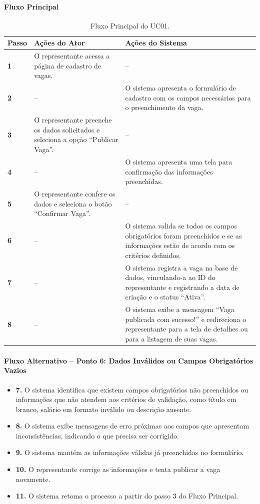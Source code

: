\documentclass[
    12pt,
    oneside,
    a4paper,
    brazil
]{abntex2}
\begin{document}
\paragraph{Fluxo Principal}
\begin{table}[H]
\centering
\small
\begin{tabularx}{\textwidth}{@{}>{\bfseries}p{1.2cm} L L@{}}
\toprule
Passo & Ações do Ator & Ações do Sistema \\
 & O representante acessa a página de cadastro de vagas. & -- \\
2 & -- & O sistema apresenta o formulário de cadastro com os campos necessários para o preenchimento da vaga. \\
3 & O representante preenche os dados solicitados e seleciona a opção ``Publicar Vaga''. & -- \\
4 & -- & O sistema apresenta uma tela para confirmação das informações preenchidas. \\
5 & O representante confere os dados e seleciona o botão ``Confirmar Vaga''. & -- \\
6 & -- & O sistema valida se todos os campos obrigatórios foram preenchidos e se as informações estão de acordo com os critérios definidos. \\
7 & -- & O sistema registra a vaga na base de dados, vinculando-a ao ID do representante e registrando a data de criação e o status ``Ativa''. \\
8 & -- & O sistema exibe a mensagem ``Vaga publicada com sucesso!'' e redireciona o representante para a tela de detalhes ou para a listagem de suas vagas. \\
\bottomrule
\end{tabularx}
\caption{Fluxo Principal do UC01.}
\label{tab:uc01_fluxo_principal}
\end{table}

\paragraph{Fluxo Alternativo -- Ponto 6: Dados Inválidos ou Campos Obrigatórios Vazios}
\begin{itemize}
    \item \textbf{7.} O sistema identifica que existem campos obrigatórios não preenchidos ou informações que não atendem aos critérios de validação, como título em branco, salário em formato inválido ou descrição ausente.
    \item \textbf{8.} O sistema exibe mensagens de erro próximas aos campos que apresentam inconsistências, indicando o que precisa ser corrigido.
    \item \textbf{9.} O sistema mantém as informações válidas já preenchidas no formulário.
    \item \textbf{10.} O representante corrige as informações e tenta publicar a vaga novamente.
    \item \textbf{11.} O sistema retoma o processo a partir do passo 3 do Fluxo Principal.
\end{itemize}
\end{document}
